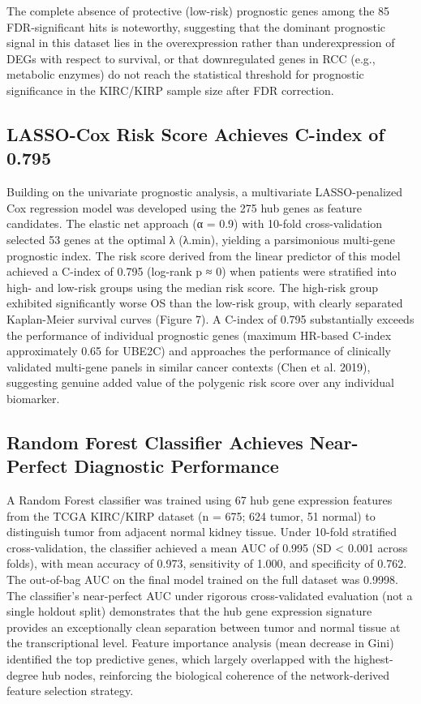 \documentclass[
  12pt,
]{article}
\begin{document}
The complete absence of protective (low-risk) prognostic genes among the
85 FDR-significant hits is noteworthy, suggesting that the dominant
prognostic signal in this dataset lies in the overexpression rather than
underexpression of DEGs with respect to survival, or that downregulated
genes in RCC (e.g., metabolic enzymes) do not reach the statistical
threshold for prognostic significance in the KIRC/KIRP sample size after
FDR correction.

\subsection{LASSO-Cox Risk Score Achieves C-index of
0.795}\label{lasso-cox-risk-score-achieves-c-index-of-0.795}

Building on the univariate prognostic analysis, a multivariate
LASSO-penalized Cox regression model was developed using the 275 hub
genes as feature candidates. The elastic net approach (α = 0.9) with
10-fold cross-validation selected 53 genes at the optimal λ (λ.min),
yielding a parsimonious multi-gene prognostic index. The risk score
derived from the linear predictor of this model achieved a C-index of
0.795 (log-rank p ≈ 0) when patients were stratified into high- and
low-risk groups using the median risk score. The high-risk group
exhibited significantly worse OS than the low-risk group, with clearly
separated Kaplan-Meier survival curves (Figure 7). A C-index of 0.795
substantially exceeds the performance of individual prognostic genes
(maximum HR-based C-index approximately 0.65 for UBE2C) and approaches
the performance of clinically validated multi-gene panels in similar
cancer contexts (Chen et al. 2019), suggesting genuine added value of
the polygenic risk score over any individual biomarker.

\subsection{Random Forest Classifier Achieves Near-Perfect Diagnostic
Performance}\label{random-forest-classifier-achieves-near-perfect-diagnostic-performance}

A Random Forest classifier was trained using 67 hub gene expression
features from the TCGA KIRC/KIRP dataset (n = 675; 624 tumor, 51 normal)
to distinguish tumor from adjacent normal kidney tissue. Under 10-fold
stratified cross-validation, the classifier achieved a mean AUC of 0.995
(SD \textless{} 0.001 across folds), with mean accuracy of 0.973,
sensitivity of 1.000, and specificity of 0.762. The out-of-bag AUC on
the final model trained on the full dataset was 0.9998. The classifier's
near-perfect AUC under rigorous cross-validated evaluation (not a single
holdout split) demonstrates that the hub gene expression signature
provides an exceptionally clean separation between tumor and normal
tissue at the transcriptional level. Feature importance analysis (mean
decrease in Gini) identified the top predictive genes, which largely
overlapped with the highest-degree hub nodes, reinforcing the biological
coherence of the network-derived feature selection strategy.
\end{document}
